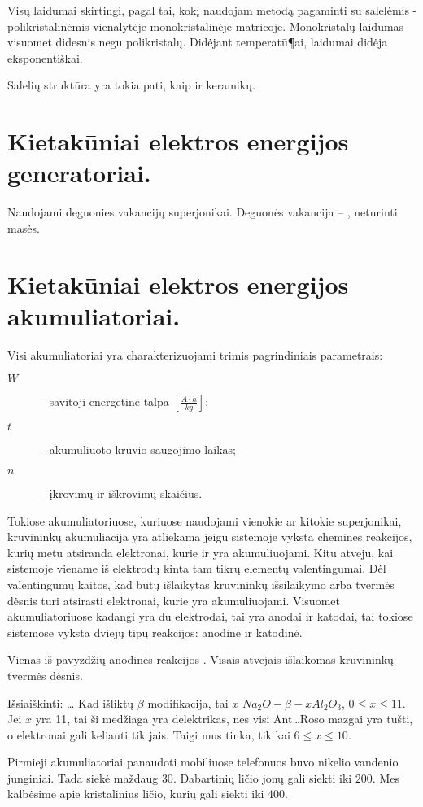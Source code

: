 Visų laidumai skirtingi, pagal tai,
kokį naudojam metodą pagaminti su salelėmis - polikristalinėmis vienalytėje monokristalinėje matricoje.
Monokristalų laidumas visuomet didesnis negu polikristalų.
Didėjant temperatū¶ai, laidumai didėja eksponentiškai.

Salelių struktūra yra tokia pati, kaip ir keramikų.

\section{Kietakūniai elektros energijos generatoriai.}
Naudojami deguonies vakancijų superjonikai. Deguonės vakancija – ,
neturinti masės.
\section{Kietakūniai elektros energijos akumuliatoriai.}

Visi akumuliatoriai yra charakterizuojami trimis pagrindiniais parametrais:
\begin{description}
  \item[$W$]  – savitoji energetinė talpa
    $\left[ \frac{A \cdot h}{kg} \right]$;
  \item[$t$] – akumuliuoto krūvio saugojimo laikas;
  \item[$n$] – įkrovimų ir iškrovimų skaičius.
\end{description}

Tokiose akumuliatoriuose, kuriuose naudojami vienokie ar kitokie
superjonikai, krūvininkų akumuliacija yra atliekama jeigu sistemoje
vyksta cheminės reakcijos, kurių metu atsiranda elektronai, kurie
ir yra akumuliuojami. Kitu atveju, kai sistemoje viename iš
elektrodų kinta tam tikrų elementų valentingumai. Dėl valentingumų
kaitos, kad būtų išlaikytas krūvininkų išsilaikymo arba tvermės
dėsnis turi atsirasti elektronai, kurie yra akumuliuojami.
Visuomet akumuliatoriuose kadangi yra du elektrodai, tai yra anodai
ir katodai, tai tokiose sistemose vyksta dviejų tipų reakcijos:
anodinė ir katodinė.

Vienas iš pavyzdžių anodinės reakcijos .
Visais atvejais išlaikomas krūvininkų tvermės dėsnis.

Išsiaiškinti:
…
Kad išliktų $\beta$ modifikacija, tai $x$ $Na_{2}O-\beta-x Al_{2}O_{3}$,
$0 \leq x \leq 11$. Jei $x$ yra 11, tai ši medžiaga yra delektrikas,
nes visi Ant…Roso mazgai yra tušti, o elektronai gali keliauti tik
jais. Taigi mus tinka, tik kai $6 \leq x \leq 10$.

Pirmieji akumuliatoriai panaudoti mobiliuose telefonuos buvo nikelio
vandenio junginiai. Tada siekė maždaug $30$. Dabartinių ličio
jonų gali siekti iki $200$. Mes kalbėsime apie kristalinius
ličio, kurių gali siekti iki $400$.

